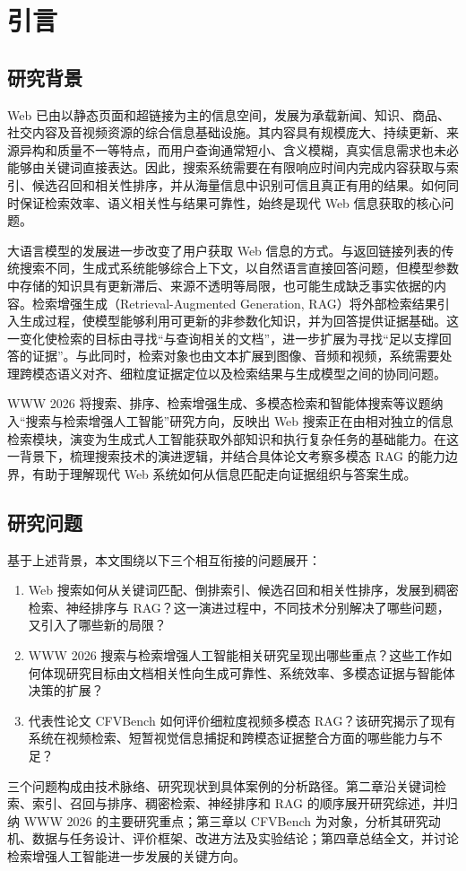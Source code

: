 \section{引言}

\subsection{研究背景}

Web 已由以静态页面和超链接为主的信息空间，发展为承载新闻、知识、商品、社交内容及音视频资源的综合信息基础设施。其内容具有规模庞大、持续更新、来源异构和质量不一等特点，而用户查询通常短小、含义模糊，真实信息需求也未必能够由关键词直接表达。因此，搜索系统需要在有限响应时间内完成内容获取与索引、候选召回和相关性排序，并从海量信息中识别可信且真正有用的结果。如何同时保证检索效率、语义相关性与结果可靠性，始终是现代 Web 信息获取的核心问题。

大语言模型的发展进一步改变了用户获取 Web 信息的方式。与返回链接列表的传统搜索不同，生成式系统能够综合上下文，以自然语言直接回答问题，但模型参数中存储的知识具有更新滞后、来源不透明等局限，也可能生成缺乏事实依据的内容。检索增强生成（Retrieval-Augmented Generation, RAG）将外部检索结果引入生成过程，使模型能够利用可更新的非参数化知识，并为回答提供证据基础\parencite{lewis2020rag}。这一变化使检索的目标由寻找“与查询相关的文档”，进一步扩展为寻找“足以支撑回答的证据”。与此同时，检索对象也由文本扩展到图像、音频和视频，系统需要处理跨模态语义对齐、细粒度证据定位以及检索结果与生成模型之间的协同问题。

WWW 2026 将搜索、排序、检索增强生成、多模态检索和智能体搜索等议题纳入“搜索与检索增强人工智能”研究方向\parencite{www2026track}，反映出 Web 搜索正在由相对独立的信息检索模块，演变为生成式人工智能获取外部知识和执行复杂任务的基础能力。在这一背景下，梳理搜索技术的演进逻辑，并结合具体论文考察多模态 RAG 的能力边界，有助于理解现代 Web 系统如何从信息匹配走向证据组织与答案生成。

\subsection{研究问题}

基于上述背景，本文围绕以下三个相互衔接的问题展开：

\begin{enumerate}[label=（\arabic*）]
  \item Web 搜索如何从关键词匹配、倒排索引、候选召回和相关性排序，发展到稠密检索、神经排序与 RAG？这一演进过程中，不同技术分别解决了哪些问题，又引入了哪些新的局限？
  \item WWW 2026 搜索与检索增强人工智能相关研究呈现出哪些重点？这些工作如何体现研究目标由文档相关性向生成可靠性、系统效率、多模态证据与智能体决策的扩展？
  \item 代表性论文 CFVBench 如何评价细粒度视频多模态 RAG？该研究揭示了现有系统在视频检索、短暂视觉信息捕捉和跨模态证据整合方面的哪些能力与不足？
\end{enumerate}

三个问题构成由技术脉络、研究现状到具体案例的分析路径。第二章沿关键词检索、索引、召回与排序、稠密检索、神经排序和 RAG 的顺序展开研究综述，并归纳 WWW 2026 的主要研究重点；第三章以 CFVBench 为对象，分析其研究动机、数据与任务设计、评价框架、改进方法及实验结论；第四章总结全文，并讨论检索增强人工智能进一步发展的关键方向。
